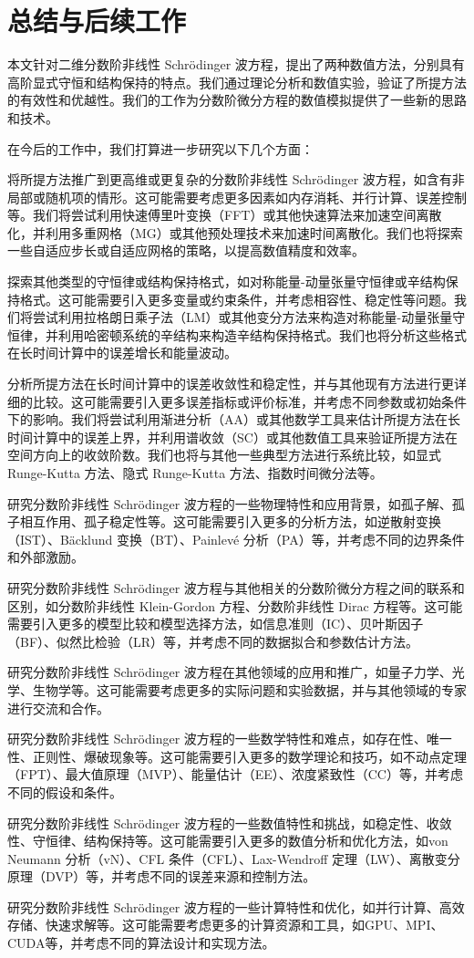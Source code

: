 
\chapter[总结与后续工作]{总结与后续工作}
本文针对二维分数阶非线性 Schr{\"o}dinger 波方程，提出了两种数值方法，分别具有高阶显式守恒和结构保持的特点。我们通过理论分析和数值实验，验证了所提方法的有效性和优越性。我们的工作为分数阶微分方程的数值模拟提供了一些新的思路和技术。

在今后的工作中，我们打算进一步研究以下几个方面：

将所提方法推广到更高维或更复杂的分数阶非线性 Schr{\"o}dinger 波方程，如含有非局部或随机项的情形。这可能需要考虑更多因素如内存消耗、并行计算、误差控制等。我们将尝试利用快速傅里叶变换（FFT）或其他快速算法来加速空间离散化，并利用多重网格（MG）或其他预处理技术来加速时间离散化。我们也将探索一些自适应步长或自适应网格的策略，以提高数值精度和效率。

探索其他类型的守恒律或结构保持格式，如对称能量-动量张量守恒律或辛结构保持格式。这可能需要引入更多变量或约束条件，并考虑相容性、稳定性等问题。我们将尝试利用拉格朗日乘子法（LM）或其他变分方法来构造对称能量-动量张量守恒律，并利用哈密顿系统的辛结构来构造辛结构保持格式。我们也将分析这些格式在长时间计算中的误差增长和能量波动。

分析所提方法在长时间计算中的误差收敛性和稳定性，并与其他现有方法进行更详细的比较。这可能需要引入更多误差指标或评价标准，并考虑不同参数或初始条件下的影响。我们将尝试利用渐进分析（AA）或其他数学工具来估计所提方法在长时间计算中的误差上界，并利用谱收敛（SC）或其他数值工具来验证所提方法在空间方向上的收敛阶数。我们也将与其他一些典型方法进行系统比较，如显式 Runge-Kutta 方法、隐式 Runge-Kutta 方法、指数时间微分法等。

研究分数阶非线性 Schr{\"o}dinger 波方程的一些物理特性和应用背景，如孤子解、孤子相互作用、孤子稳定性等。这可能需要引入更多的分析方法，如逆散射变换（IST）、Bäcklund 变换（BT）、Painlevé 分析（PA）等，并考虑不同的边界条件和外部激励。

研究分数阶非线性 Schr{\"o}dinger 波方程与其他相关的分数阶微分方程之间的联系和区别，如分数阶非线性 Klein-Gordon 方程、分数阶非线性 Dirac 方程等。这可能需要引入更多的模型比较和模型选择方法，如信息准则（IC）、贝叶斯因子（BF）、似然比检验（LR）等，并考虑不同的数据拟合和参数估计方法。

研究分数阶非线性 Schr{\"o}dinger 波方程在其他领域的应用和推广，如量子力学、光学、生物学等。这可能需要考虑更多的实际问题和实验数据，并与其他领域的专家进行交流和合作。

研究分数阶非线性 Schr{\"o}dinger 波方程的一些数学特性和难点，如存在性、唯一性、正则性、爆破现象等。这可能需要引入更多的数学理论和技巧，如不动点定理（FPT）、最大值原理（MVP）、能量估计（EE）、浓度紧致性（CC）等，并考虑不同的假设和条件。

研究分数阶非线性 Schr{\"o}dinger 波方程的一些数值特性和挑战，如稳定性、收敛性、守恒律、结构保持等。这可能需要引入更多的数值分析和优化方法，如von Neumann 分析（vN）、CFL 条件（CFL）、Lax-Wendroff 定理（LW）、离散变分原理（DVP）等，并考虑不同的误差来源和控制方法。

研究分数阶非线性 Schr{\"o}dinger 波方程的一些计算特性和优化，如并行计算、高效存储、快速求解等。这可能需要考虑更多的计算资源和工具，如GPU、MPI、CUDA等，并考虑不同的算法设计和实现方法。